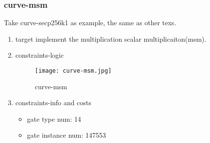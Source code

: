 \subsubsection{curve-msm}
\label{curve-msm}

Take curve-secp256k1 as example, the same as other texs.

\begin{enumerate}
    \item target
        implement the multiplication scalar multiplicaiton(msm). 
    \item constraints-logic
        \begin{figure}[!ht]
            \centering
            \texttt{[image: curve-msm.jpg]}
            \caption{curve-msm}
            \label{fig:curve-msm}
        \end{figure}
    
    \item constraints-info and costs
        \begin{itemize}
            \item gate type num: 14
            \item gate instance num: 147553
        \end{itemize}
\end{enumerate}